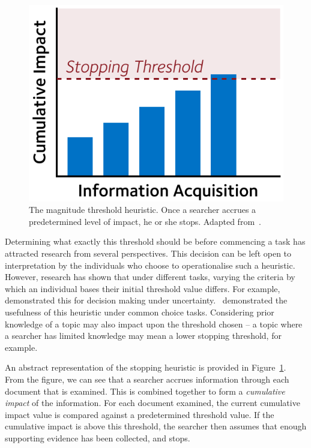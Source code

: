 \begin{figure}
    \begin{center}
    \vspace*{-5mm}
    \includegraphics[width=1\textwidth]{figures/ch3-threshold.pdf}
    \end{center}
    \vspace*{-6mm}
    \caption[The magnitude threshold stopping heuristic]{The magnitude threshold heuristic. Once a searcher accrues a predetermined level of impact, he or she stops. Adapted from~\cite{browne2004stopping_rules}.}
    \label{fig:threshold}
\end{figure}

Determining what exactly this threshold should be before commencing a task has attracted research from several perspectives. This decision can be left open to interpretation by the individuals who choose to operationalise such a heuristic. However, research has shown that under different tasks, varying the criteria by which an individual bases their initial threshold value differs. For example,~\cite{busemeyer1982choice_behaviour} demonstrated this for decision making under uncertainty.~\cite{saad1996stopping} demonstrated the usefulness of this heuristic under common choice tasks. Considering prior knowledge of a topic may also impact upon the threshold chosen -- a topic where a searcher has limited knowledge may mean a lower stopping threshold, for example.

An abstract representation of the stopping heuristic is provided in Figure~\ref{fig:threshold}. From the figure, we can see that a searcher accrues information through each document that is examined. This is combined together to form a \emph{cumulative impact} of the information. For each document examined, the current cumulative impact value is compared against a predetermined threshold value. If the cumulative impact is above this threshold, the searcher then assumes that enough supporting evidence has been collected, and stops.

